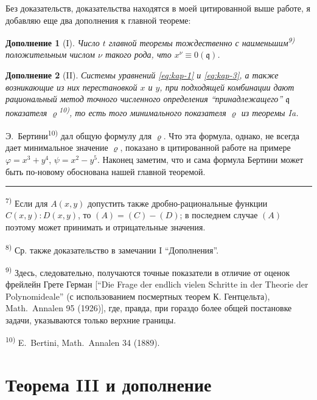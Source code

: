 \documentclass[11pt]{article}
\newcommand{\foreign}[1]{#1}
\theoremstyle{plain}
\newtheorem{zusatz}{Дополнение}
\begin{document}
\smallskip
Без доказательств, доказательства находятся в моей цитированной
выше работе, я добавляю еще два дополнения к главной теореме:

\begin{zusatz}[I]
Число $t$ главной теоремы тождественно с наименьшим\textsuperscript{9)}
положительным числом $\nu$ такого рода, что
$x^{\nu} \equiv 0(\mathfrak{q})$.
\end{zusatz}

\begin{zusatz}[II]
Системы уравнений \eqref{eq:kap-1} и \eqref{eq:kap-3}, а также
возникающие из них перестановкой $x$ и $y$, при подходящей
комбинации дают рациональный метод точного численного определения
``принадлежащего'' $\mathfrak{q}$ показателя
$\varrho$\textsuperscript{10)}, то есть того минимального показателя
$\varrho$ из теоремы Ia.
\end{zusatz}

Э.\ Бертини\textsuperscript{10)} дал общую формулу для $\varrho$.
Что эта формула, однако, не всегда дает минимальное значение
$\varrho$, показано в цитированной работе на примере
$\varphi = x^{3} + y^{4}$, $\psi = x^{2} - y^{5}$. Наконец заметим,
что и сама формула Бертини может быть по-новому обоснована нашей
главной теоремой.

\vspace{0.5em}
\noindent\rule{\textwidth}{0.4pt}
\vspace{0.3em}

{\footnotesize
\textsuperscript{7)} Если для $A(x,y)$ допустить также дробно-рациональные
функции $C(x,y):D(x,y)$, то $(A) = (C) - (D)$; в последнем случае
$(A)$ поэтому может принимать и отрицательные значения.

\textsuperscript{8)} Ср. также доказательство в замечании I ``Дополнения''.

\textsuperscript{9)} Здесь, следовательно, получаются точные показатели в
отличие от оценок фрейлейн Грете Герман [``Die Frage der endlich vielen Schritte
in der Theorie der Polynomideale'' (с использованием посмертных теорем
К. Гентцельта), \foreign{Math.\ Annalen} 95 (1926)], где, правда, при
гораздо более общей постановке задачи, указываются только верхние границы.

\textsuperscript{10)} E.\ Bertini, \foreign{Math.\ Annalen} 34 (1889).
}

\newpage
\section*{Теорема III и дополнение}
\end{document}

